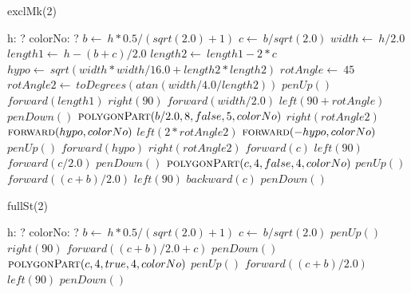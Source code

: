\documentclass[a4paper,10pt]{article}
\begin{document}
\begin{algorithm}
\caption{exclMk(2)}
\begin{algorithmic}[5]
\State {}
\State {}
    \State h: ?
    \State colorNo: ?
  \EndDecl
  \State \(b\gets\ h*0.5/(sqrt(2.0)+1)\)
  \State \(c\gets\ b/sqrt(2.0)\)
  \State \(width\gets\ h/2.0\)
  \State \(length1\gets\ h-(b+c)/2.0\)
  \State \(length2\gets\ length1-2*c\)
  \State \(hypo\gets\ sqrt(width*width/16.0+length2*length2)\)
  \State \(rotAngle\gets\ 45\)
  \State \(rotAngle2\gets\ toDegrees(atan(width/4.0/length2))\)
  \State \(penUp()\)
  \State \(forward(length1)\)
  \State \(right(90)\)
  \State \(forward(width/2.0)\)
  \State \(left(90+rotAngle)\)
  \State \(penDown()\)
  \State {}
  \State {}
  \State \(\Call{polygonPart}{b/2.0,8,false,5,colorNo}\)
  \State \(right(rotAngle2)\)
  \State \(\Call{forward}{hypo,colorNo}\)
  \State \(left(2*rotAngle2)\)
  \State \(\Call{forward}{-hypo,colorNo}\)
  \State \(penUp()\)
  \State \(forward(hypo)\)
  \State \(right(rotAngle2)\)
  \State \(forward(c)\)
  \State \(left(90)\)
  \State \(forward(c/2.0)\)
  \State \(penDown()\)
  \State {}
  \State {}
  \State \(\Call{polygonPart}{c,4,false,4,colorNo}\)
  \State \(penUp()\)
  \State \(forward((c+b)/2.0)\)
  \State \(left(90)\)
  \State \(backward(c)\)
  \State \(penDown()\)
\EndProcedure
\end{algorithmic}
\end{algorithm}


\begin{algorithm}
\caption{fullSt(2)}
\begin{algorithmic}[5]
\State {}
\State {}
    \State h: ?
    \State colorNo: ?
  \EndDecl
  \State \(b\gets\ h*0.5/(sqrt(2.0)+1)\)
  \State \(c\gets\ b/sqrt(2.0)\)
  \State \(penUp()\)
  \State \(right(90)\)
  \State \(forward((c+b)/2.0+c)\)
  \State \(penDown()\)
  \State {}
  \State {}
  \State \(\Call{polygonPart}{c,4,true,4,colorNo}\)
  \State \(penUp()\)
  \State \(forward((c+b)/2.0)\)
  \State \(left(90)\)
  \State \(penDown()\)
\EndProcedure
\end{algorithmic}
\end{algorithm}
\end{document}
